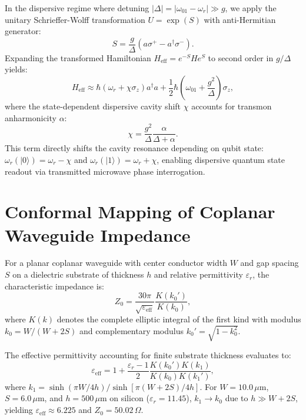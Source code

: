 \documentclass[10pt,journal,compsoc]{IEEEtran}
\begin{document}
In the dispersive regime where detuning $|\Delta| = |\omega_{01} - \omega_r| \gg g$, we apply the unitary Schrieffer-Wolff transformation $U = \exp(S)$ with anti-Hermitian generator:
\begin{equation}
S = \frac{g}{\Delta} (a \sigma^+ - a^\dagger \sigma^-).
\end{equation}
Expanding the transformed Hamiltonian $H_{\text{eff}} = e^{-S} H e^S$ to second order in $g/\Delta$ yields:
\begin{equation}
H_{\text{eff}} \approx \hbar \left(\omega_r + \chi \sigma_z\right) a^\dagger a + \frac{1}{2} \hbar \left(\omega_{01} + \frac{g^2}{\Delta}\right) \sigma_z,
\end{equation}
where the state-dependent dispersive cavity shift $\chi$ accounts for transmon anharmonicity $\alpha$:
\begin{equation}
\chi = \frac{g^2}{\Delta} \frac{\alpha}{\Delta + \alpha}.
\end{equation}
This term directly shifts the cavity resonance depending on qubit state: $\omega_r(|0\rangle) = \omega_r - \chi$ and $\omega_r(|1\rangle) = \omega_r + \chi$, enabling dispersive quantum state readout via transmitted microwave phase interrogation.

\section{Conformal Mapping of Coplanar Waveguide Impedance}
For a planar coplanar waveguide with center conductor width $W$ and gap spacing $S$ on a dielectric substrate of thickness $h$ and relative permittivity $\varepsilon_r$, the characteristic impedance is:
\begin{equation}
Z_0 = \frac{30\pi}{\sqrt{\varepsilon_{\text{eff}}}} \frac{K(k_0')}{K(k_0)},
\end{equation}
where $K(k)$ denotes the complete elliptic integral of the first kind with modulus $k_0 = W/(W + 2S)$ and complementary modulus $k_0' = \sqrt{1 - k_0^2}$. 

The effective permittivity accounting for finite substrate thickness evaluates to:
\begin{equation}
\varepsilon_{\text{eff}} = 1 + \frac{\varepsilon_r - 1}{2} \frac{K(k_0') K(k_1)}{K(k_0) K(k_1')},
\end{equation}
where $k_1 = \sinh(\pi W / 4h) / \sinh[\pi(W + 2S)/4h]$. For $W = 10.0\,\mu\text{m}$, $S = 6.0\,\mu\text{m}$, and $h = 500\,\mu\text{m}$ on silicon ($\varepsilon_r = 11.45$), $k_1 \to k_0$ due to $h \gg W + 2S$, yielding $\varepsilon_{\text{eff}} \approx 6.225$ and $Z_0 = 50.02\,\Omega$.
\end{document}
